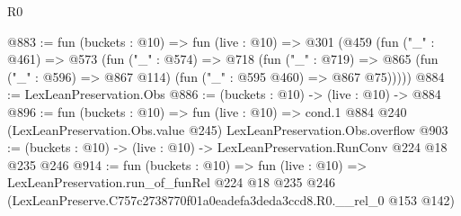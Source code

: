 \begin{lexlean}{R0}
\begin{coremodule}
@883 := fun (buckets : @10) =>
  fun (live : @10) =>
  @301
    (@459
      (fun ("_" : @461) =>
      @573
        (fun ("_" : @574) =>
        @718
          (fun ("_" : @719) =>
          @865 (fun ("_" : @596) => @867 @114) (fun ("_" : @595 @460) => @867 @75)))))
@884 := LexLeanPreservation.Obs
@886 := (buckets : @10) -> (live : @10) -> @884
@896 := fun (buckets : @10) =>
  fun (live : @10) =>
  cond.{1} @884 @240 (LexLeanPreservation.Obs.value @245) LexLeanPreservation.Obs.overflow
@903 := (buckets : @10) -> (live : @10) -> LexLeanPreservation.RunConv @224 @18 @235 @246
@914 := fun (buckets : @10) =>
  fun (live : @10) =>
  LexLeanPreservation.run_of_funRel
    @224
    @18
    @235
    @246
    (LexLeanPreserve.C757c2738770f01a0eadefa3deda3ccd8.R0.__rel_0 @153 @142)
\end{coremodule}
\end{lexlean}
